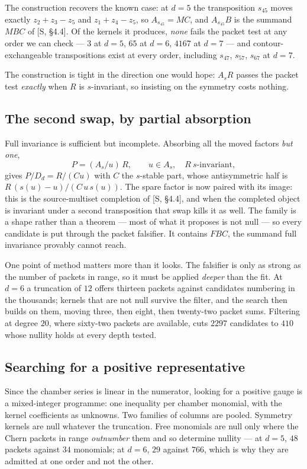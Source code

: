 \documentclass[11pt,a4paper]{article}
\theoremstyle{plain}
\theoremstyle{definition}
\theoremstyle{remark}
\begin{document}
The construction recovers the known case: at $d = 5$ the transposition $s_{45}$ moves exactly
$z_2 + z_3 - z_5$ and $z_1 + z_4 - z_5$, so $A_{s_{45}} = MC$, and $A_{s_{45}}B$ is the summand
$MBC$ of [S, \S4.4]. Of the kernels it produces, \emph{none} fails the packet test at any order
we can check --- $3$ at $d = 5$, $65$ at $d = 6$, $4167$ at $d = 7$ --- and contour-exchangeable
transpositions exist at every order, including $s_{47}$, $s_{57}$, $s_{67}$ at $d = 7$.

The construction is tight in the direction one would hope: $A_sR$ passes the packet test
\emph{exactly} when $R$ is $s$-invariant, so insisting on the symmetry costs nothing.

\subsection{The second swap, by partial absorption}

Full invariance is sufficient but incomplete. Absorbing all the moved factors \emph{but one},
\[
  P = (A_s/u)\,R, \qquad u \in A_s, \quad R \ \text{$s$-invariant},
\]
gives $P/D_d = R/(Cu)$ with $C$ the $s$-stable part, whose antisymmetric half is
$R\,(s(u)-u)/(C\,u\,s(u))$. The spare factor is now paired with its image: this is the
source-multiset completion of [S, \S4.4], and when the completed object is invariant under a
second transposition that swap kills it as well. The family is a shape rather than a theorem
--- most of what it proposes is not null --- so every candidate is put through the packet
falsifier. It contains $FBC$, the summand full invariance provably cannot reach.

One point of method matters more than it looks. The falsifier is only as strong as the number
of packets in range, so it must be applied \emph{deeper} than the fit. At $d = 6$ a truncation
of $12$ offers thirteen packets against candidates numbering in the thousands; kernels that
are not null survive the filter, and the search then builds on them, moving three, then eight,
then twenty-two packet sums. Filtering at degree $20$, where sixty-two packets are available,
cuts $2297$ candidates to $410$ whose nullity holds at every depth tested.

\subsection{Searching for a positive representative}
\label{sec:gaugesearch}

Since the chamber series is linear in the numerator, looking for a positive gauge is a
mixed-integer programme: one inequality per chamber monomial, with the kernel coefficients as
unknowns. Two families of columns are pooled. Symmetry kernels are null whatever the
truncation. Free monomials are null only where the Chern packets in range \emph{outnumber}
them and so determine nullity --- at $d = 5$, $48$ packets against $34$ monomials; at $d = 6$,
$29$ against $766$, which is why they are admitted at one order and not the other.
\end{document}

